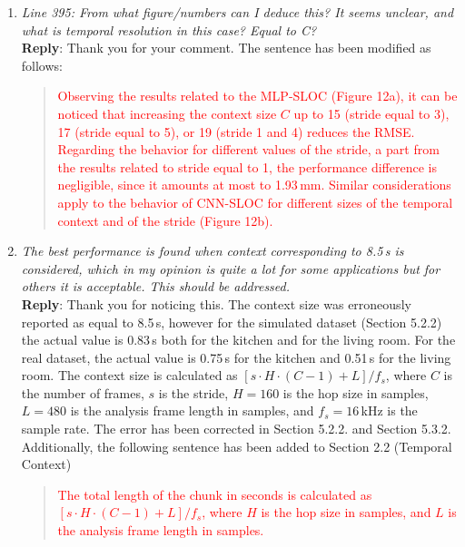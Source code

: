 \documentclass[11pt, technote, letterpaper, oneside, onecolumn]{IEEEtran}
\begin{document}
\begin{enumerate}
\item \textit{Line 395: From what figure/numbers can I deduce this? It seems unclear, and what is temporal resolution in this case? Equal to C?\\}
\textbf{Reply}: Thank you for your comment. The sentence has been modified as follows:
\begin{quote}
\textcolor{red}{Observing the results related to the MLP-SLOC (Figure 12a), it can be noticed that increasing the context size $C$ up to 15 (stride equal to 3), 17 (stride equal to 5), or 19 (stride 1 and 4) reduces the RMSE. Regarding the behavior for different values of the stride, a part from the results related to stride equal to 1, the performance difference is negligible, since it amounts at most to 1.93\,mm. Similar considerations apply to the behavior of CNN-SLOC for different sizes of the temporal context and of the stride (Figure 12b).}
\end{quote}


\item \textit{The best performance is found when context corresponding to 8.5\,s is considered, which in my opinion is quite a lot for some applications but for others it is acceptable. This should be addressed.\\}
\textbf{Reply}:  Thank you for noticing this. The context size was erroneously reported as equal to 8.5\,s, however for the simulated dataset (Section 5.2.2) the actual value is 0.83\,s both for the kitchen and for the living room. For the real dataset, the actual value is 0.75\,s for the kitchen and 0.51\,s for the living room. The context size is calculated as $\left [s\cdot H \cdot(C-1)+L \right ]/f_s$, where $C$ is the number of frames, $s$ is the stride, $H=160$ is the hop size in samples,  $L=480$ is the analysis frame length in samples, and $f_s=16$\,kHz is the sample rate. The error has been corrected in Section 5.2.2. and Section 5.3.2. Additionally, the following sentence has been added to Section 2.2 (Temporal Context)

\begin{quote}
\textcolor{red}{The total length of the chunk in seconds is calculated as $\left [s\cdot H \cdot(C-1)+L \right ]/f_s$, where $H$ is the hop size in samples, and $L$ is the analysis frame length in samples.}
\end{quote}



\end{enumerate}
\end{document}
